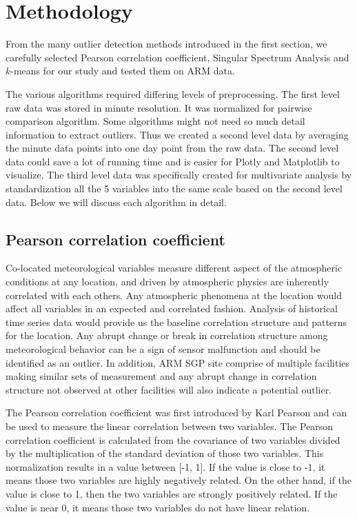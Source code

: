 \section{Methodology}
From the many outlier detection methods introduced in the first section,
we carefully selected Pearson correlation coefficient, Singular
Spectrum Analysis and $k$-means for our study and tested them on ARM data. 

The various algorithms required differing levels of preprocessing. The
first level raw data was stored in minute resolution. It was normalized
for pairwise comparison algorithm. Some algorithms might not need
so much detail information to extract outliers. Thus we created a
second level data by averaging the minute data points into one
day point from the raw data. The second level data could save a lot
of running time and is easier for Plotly \cite{plotly} and
Matplotlib \cite{Hunter:2007} to visualize. The third level data
was specifically created for multivariate analysis by standardization
all the 5 variables into the same scale based on the second level
data. Below we will discuss each algorithm in detail. 

\subsection{Pearson correlation coefficient}
Co-located meteorological variables measure different aspect of the
atmospheric conditions at any location, and driven by atmospheric physics
are inherently correlated with each others. Any atmospheric phenomena at
the location would affect all variables in an expected
and correlated fashion.  Analysis of historical time
series data would provide us the baseline correlation structure and
patterns for the location. Any abrupt change or break in
correlation structure among meteorological behavior can be a sign of
sensor malfunction and should be identified as an outlier. In addition,
ARM SGP site comprise of multiple facilities making similar sets of
measurement and any abrupt change in correlation structure not observed
at other facilities will also indicate a potential outlier.

The Pearson correlation coefficient was first introduced by Karl
Pearson\cite{pearson1895note} and can be used to measure the linear
correlation between two variables. The Pearson correlation coefficient
is calculated from the covariance of two variables divided by the
multiplication of the standard deviation of those two variables. This
normalization results in a value between [-1, 1]. If the value is close
to -1, it means those two variables are highly negatively related. On
the other hand, if the value is close to 1, then the two variables are strongly positively related.
If the value is near 0, it means those two variables do not have linear
relation. 

